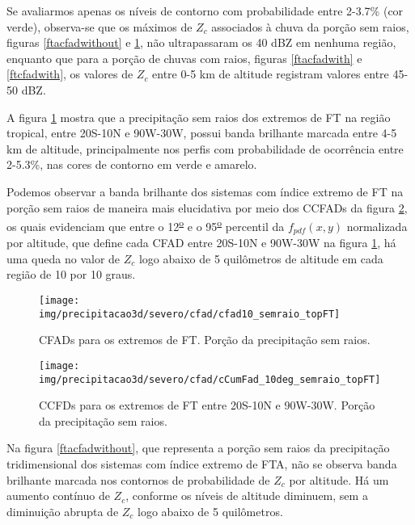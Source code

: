 
Se avaliarmos apenas os níveis de contorno com probabilidade entre 2-3.7\% (cor verde), observa-se que os máximos de $Z_c$ associados à chuva da porção sem raios, figuras \ref{ftacfadwithout} e \ref{ftcfadwithout}, não ultrapassaram os 40 dBZ em nenhuma região, enquanto que para a porção de chuvas com raios, figuras \ref{ftacfadwith} e \ref{ftcfadwith}, os valores de $Z_c$ entre 0-5 km de altitude registram valores entre 45-50 dBZ.

A figura \ref{ftcfadwithout} mostra que a precipitação sem raios dos extremos de FT na região tropical, entre 20S-10N e 90W-30W, possui banda brilhante marcada entre 4-5 km de altitude, principalmente nos perfis com probabilidade de ocorrência entre 2-5.3\%, nas cores de contorno em verde e amarelo. 

Podemos observar a banda brilhante dos sistemas com índice extremo de FT na porção sem raios de maneira mais elucidativa por meio dos CCFADs da figura \ref{ftccfadwithout}, os quais evidenciam que entre o 12\textsuperscript{\underline{o}} e o 95\textsuperscript{\underline{o}} percentil da $f_{pdf}(x,y)$ normalizada por altitude, que define cada CFAD entre 20S-10N e 90W-30W na figura \ref{ftcfadwithout}, há uma queda no valor de $Z_c$ logo abaixo de 5 quilômetros de altitude em cada região de 10 por 10 graus. 

\begin{figure}[!ht]
  \centering
  \texttt{[image: img/precipitacao3d/severo/cfad/cfad10\_semraio\_topFT]}
 \caption{CFADs para os extremos de FT. Porção da precipitação sem raios.}
 \label{ftcfadwithout}
\end{figure} 

\begin{figure}[!ht]
  \centering
   {\texttt{[image: img/precipitacao3d/severo/cfad/cCumFad\_10deg\_semraio\_topFT]}}
 \caption{CCFDs para os extremos de FT entre 20S-10N e 90W-30W. Porção da precipitação sem raios.}
 \label{ftccfadwithout}
\end{figure} 

Na figura \ref{ftacfadwithout}, que representa a porção sem raios da precipitação tridimensional dos sistemas com índice extremo de FTA, não se observa banda brilhante marcada nos contornos de probabilidade de $Z_c$ por altitude. Há um aumento contínuo de $Z_c$,  conforme os níveis de altitude diminuem, sem a diminuição abrupta de $Z_c$ logo abaixo de 5 quilômetros.   

